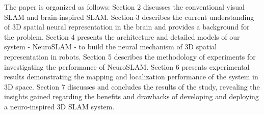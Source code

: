 The paper is organized as follows: Section 2 discusses the conventional visual SLAM and brain-inspired SLAM. 
Section 3 describes the current understanding of 3D spatial neural representation in the brain and provides a background for the problem. 
Section 4 presents the architecture and detailed models of our system - NeuroSLAM - to build the neural mechanism of 3D spatial representation in robots. 
Section 5 describes the methodology of experiments for investigating the performance of NeuroSLAM. 
Section 6 presents experimental results demonstrating the mapping and localization performance of the system in 3D space. 
Section 7 discusses and concludes the results of the study, revealing the insights gained regarding the benefits and drawbacks of developing and deploying a neuro-inspired 3D SLAM system.











